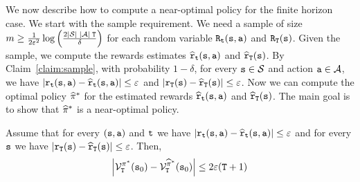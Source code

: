 We now describe how to compute a near-optimal policy for the finite
horizon case. We start with the sample requirement. We need a sample
of size $m\geq \frac{1}{2\varepsilon^2}\log\left(
\frac{2|\mathcal{S}|\;|\mathcal{A}|\; {\tt T}}{\delta}\right)$ for each random
variable ${\tt R}_{\tt t}({\tt s},{\tt a})$ and
${\tt R}_{\tt T}({\tt s})$. Given the sample, we compute the
rewards estimates $\widehat{{\tt r}}_{\tt t}({\tt s},{\tt a})$ and
$\widehat{{\tt r}}_{\tt T}({\tt s})$. By Claim~\ref{claim:sample},
with probability $1-\delta$, for every ${\tt s}\in\mathcal{S}$ and action
${\tt a} \in\mathcal{A}$, we have
$|{\tt r}_{\tt t}({\tt s},{\tt a})-\widehat{{\tt r}}_{\tt t}({\tt s},{\tt a})|\leq
\varepsilon$ and
$|{\tt r}_{\tt T}({\tt s})-\widehat{{\tt r}}_{\tt T}({\tt s})|\leq\varepsilon$.
Now we can compute the optimal policy $\widehat{\pi}^*$ for the
estimated rewards $\widehat{{\tt r}}_{\tt t}({\tt s},{\tt a})$ and
$\widehat{{\tt r}}_{\tt T}({\tt s})$. The main goal is to show that
$\widehat{\pi}^*$ is a near-optimal policy.

\begin{theorem}
Assume that for every $({\tt s},{\tt a})$ and ${\tt t}$ we have
$|{\tt r}_{\tt t}({\tt s},{\tt a})-\widehat{{\tt r}}_{\tt t}({\tt s},{\tt a})|\leq
\varepsilon$ and for every ${\tt s}$ we have
$|{\tt r}_{\tt T}({\tt s})-\widehat{{\tt r}}_{\tt T}({\tt s})|\leq\varepsilon$.
Then,
\[
\left|\mathcal{V}^{\pi^*}_{\tt T}({\tt s}_0) -
\mathcal{V}^{\widehat{\pi}^*}_{\tt T} ({\tt s}_0)\right| \leq
2\varepsilon({\tt T}+1)
\]
\end{theorem}

